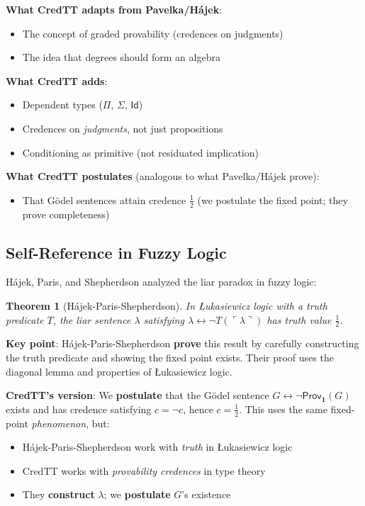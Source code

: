 \documentclass[11pt,a4paper]{article}
\newtheorem{theorem}{Theorem}[section]
\newcommand{\one}{\mathbf{1}}
\newcommand{\negc}{\neg}
\begin{document}
\textbf{What CredTT adapts from Pavelka/H\'ajek}:
\begin{itemize}
    \item The concept of graded provability (credences on judgments)
    \item The idea that degrees should form an algebra
\end{itemize}

\textbf{What CredTT adds}:
\begin{itemize}
    \item Dependent types ($\Pi$, $\Sigma$, $\mathsf{Id}$)
    \item Credences on \emph{judgments}, not just propositions
    \item Conditioning as primitive (not residuated implication)
\end{itemize}

\textbf{What CredTT postulates} (analogous to what Pavelka/H\'ajek prove):
\begin{itemize}
    \item That G\"odel sentences attain credence $\frac{1}{2}$ (we postulate the fixed point; they prove completeness)
\end{itemize}

\subsection{Self-Reference in Fuzzy Logic}

H\'ajek, Paris, and Shepherdson \citep{hajek2000liar} analyzed the liar paradox in fuzzy logic:

\begin{theorem}[H\'ajek-Paris-Shepherdson]
In {\L}ukasiewicz logic with a truth predicate $T$, the liar sentence $\lambda$ satisfying $\lambda \leftrightarrow \neg T(\ulcorner \lambda \urcorner)$ has truth value $\frac{1}{2}$.
\end{theorem}

\textbf{Key point}: H\'ajek-Paris-Shepherdson \textbf{prove} this result by carefully constructing the truth predicate and showing the fixed point exists. Their proof uses the diagonal lemma and properties of {\L}ukasiewicz logic.

\textbf{CredTT's version}: We \textbf{postulate} that the G\"odel sentence $G \leftrightarrow \neg\mathsf{Prov}_\one(G)$ exists and has credence satisfying $c = \negc c$, hence $c = \frac{1}{2}$. This uses the same fixed-point \emph{phenomenon}, but:
\begin{itemize}
    \item H\'ajek-Paris-Shepherdson work with \emph{truth} in {\L}ukasiewicz logic
    \item CredTT works with \emph{provability credences} in type theory
    \item They \textbf{construct} $\lambda$; we \textbf{postulate} $G$'s existence
\end{itemize}
\end{document}
